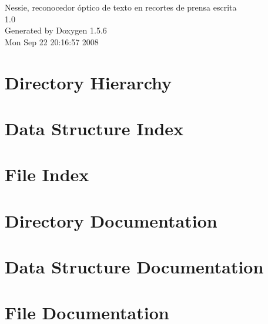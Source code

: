 \documentclass[a4paper]{book}
\begin{document}
\begin{titlepage}
\vspace*{7cm}
\begin{center}
{\Large Nessie, reconocedor óptico de texto en recortes de prensa escrita \\[1ex]\large 1.0 }\\
\vspace*{1cm}
{\large Generated by Doxygen 1.5.6}\\
\vspace*{0.5cm}
{\small Mon Sep 22 20:16:57 2008}\\
\end{center}
\end{titlepage}
\clearemptydoublepage
{}
\tableofcontents
\clearemptydoublepage
{}
\chapter{Directory Hierarchy}

\chapter{Data Structure Index}

\chapter{File Index}

\chapter{Directory Documentation}


\chapter{Data Structure Documentation}




\chapter{File Documentation}



\printindex
\end{document}
